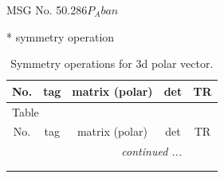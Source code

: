 \documentclass[fleqn,8pt]{jsarticle}
\begin{document}
\setcounter{MaxMatrixCols}{32}

\renewcommand{\tablename}{Table~}
\renewcommand{\figurename}{Figure~}
\begin{center}
\LARGE
MSG No. 50.286\quad$P_{A}ban$
\end{center}
* symmetry operation
\renewcommand{\arraystretch}{1.3}
\begin{longtable}{ccccc}
\caption{Symmetry operations for 3d polar vector.}
 \\
 \hline \hline
No. & tag & matrix (polar) & det & TR \\ \hline \endfirsthead

\multicolumn{4}{l}{\tablename\ \thetable{}} \\
 \hline \hline
No. & tag & matrix (polar) & det & TR \\ \hline \endhead

 \hline \hline
\multicolumn{4}{r}{\footnotesize\it continued ...} \\ \endfoot

 \hline \hline
\multicolumn{4}{r}{} \\ \endlastfoot


\end{longtable}
\end{document}
